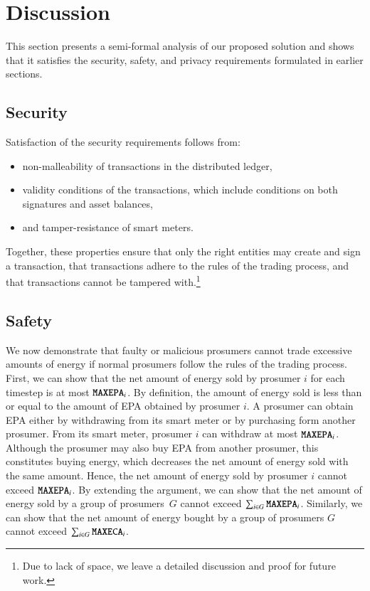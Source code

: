 \section{Discussion}
\label{sec:discussion}

This section presents a semi-formal analysis of our proposed solution
and shows that it satisfies the security, safety, and privacy
requirements formulated in earlier sections.

\subsection{Security}
Satisfaction of the security requirements follows from:
\begin{itemize}[noitemsep,topsep=-\parskip]
\item non-malleability of transactions in the distributed ledger,
\item validity conditions of the transactions, which include conditions on both signatures and asset balances,
\item and tamper-resistance of smart meters.
\end{itemize}
Together, these properties ensure that only the right entities may
create and sign a transaction, that transactions adhere to the rules
of the trading process, and that transactions cannot be tampered
with.\footnote{Due to lack of space, we leave a detailed discussion
  and proof for future work.}

\subsection{Safety}
We now demonstrate that faulty or malicious prosumers cannot trade
excessive amounts of energy if normal prosumers follow the rules of
the trading process.
%
First, we can show that the net amount of energy sold by prosumer $i$ for
each timestep is at most $\texttt{MAXEPA}_i$.  By definition, the
amount of energy sold is less than or equal to the amount of EPA
obtained by prosumer $i$.  A prosumer can obtain EPA either by
withdrawing from its smart meter or by purchasing form another
prosumer.  From its smart meter, prosumer $i$ can withdraw at most
$\texttt{MAXEPA}_i$.
Although the prosumer may also buy EPA from another prosumer, this
constitutes buying energy, which decreases the net amount of energy
sold with the same amount.
Hence, the net amount of energy sold by prosumer $i$ cannot exceed
$\texttt{MAXEPA}_i$.  By extending the argument, we can show that the net
amount of energy sold by a group of prosumers~$G$ cannot exceed
$\sum_{i \in G} \texttt{MAXEPA}_i$.  Similarly, we can show that the net
amount of energy bought by a group of prosumers $G$ cannot exceed
$\sum_{i \in G} \texttt{MAXECA}_i$.


